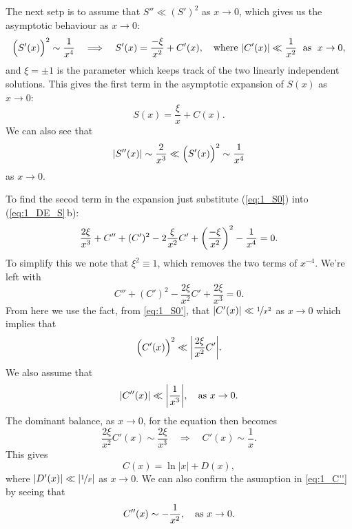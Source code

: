 \documentclass[11pt,letter, swedish, english
]{article}
\newcommand{\as}{\qcomma\text{as }}
\begin{document}
The next setp is to assume that $S''\ll(S')^2$ as $x\to0$, which gives
us the asymptotic behaviour as $x\to0$:
\begin{equation}\label{eq:1_S0'}
\Big(S'(x)\Big)^2\sim \frac{1}{x^4}
\quad\Longrightarrow\quad
S'(x)= \frac{-\xi}{x^2} + C'(x)\qcomma\text{where }
|C'(x)|\ll\frac{1}{x^2} \;\text{ as }\; x\to0,
\end{equation}
and $\xi=\pm1$ is the parameter which keeps track of the two linearly
independent solutions. This gives the first term in the asymptotic
expansion of $S(x)$ as $x\to0$: 
\begin{equation}\label{eq:1_S0}
S(x)=\frac{\xi}{x} + C(x).
\end{equation}
We can also see that
\begin{equation}
\abs{S''(x)}\sim\frac{2}{x^3}\ll\Big(S'(x)\Big)^2\sim\frac{1}{x^4}
\end{equation}
as $x\to0$.

To find the secod term in the expansion just substitute
(\ref{eq:1_S0}) into (\ref{eq:1_DE_S}\,b):
\begin{equation}
\frac{2\xi}{x^3}+C''
+(C')^2-2\frac{\xi}{x^2}C' + \qty(\frac{-\xi}{x^2})^2
-\frac{1}{x^4}=0.
\end{equation}
To simplify this we note that $\xi^2\equiv1$, which removes the two
terms of $x^{-4}$. We're left with
\begin{equation}
C''+(C')^2-\frac{2\xi}{x^2}C' + \frac{2\xi}{x^3} = 0.
\end{equation}
From here we use the fact, from \eqref{eq:1_S0'}, that
$|C'(x)|\ll\nicefrac{1}{x^2}$ as $x\to0$ which implies that
\begin{equation}
\Big(C'(x)\Big)^2\ll\abs{\frac{2\xi}{x^2}C'}.
\end{equation}
We also assume that
\begin{equation}\label{eq:1_C''}
\abs{C''(x)}\ll\abs{\frac{1}{x^3}}\as x\to0.
\end{equation}
The dominant balance, as $x\to0$, for the equation then becomes
\begin{equation}
\frac{2\xi}{x^2}C'(x) \sim \frac{2\xi}{x^3}
\quad\Longrightarrow\quad
C'(x)\sim\frac{1}{x}.
\end{equation}
This gives 
\begin{equation}
C(x)=\ln|x|+D(x),
\end{equation}
where $|D'(x)|\ll|\nicefrac{1}{x}|$ as $x\to0$. We can also confirm the
asumption in \eqref{eq:1_C''} by seeing that
\begin{equation}
C''(x)\sim -\frac{1}{x^2}\as x\to0.
\end{equation}
\end{document}
